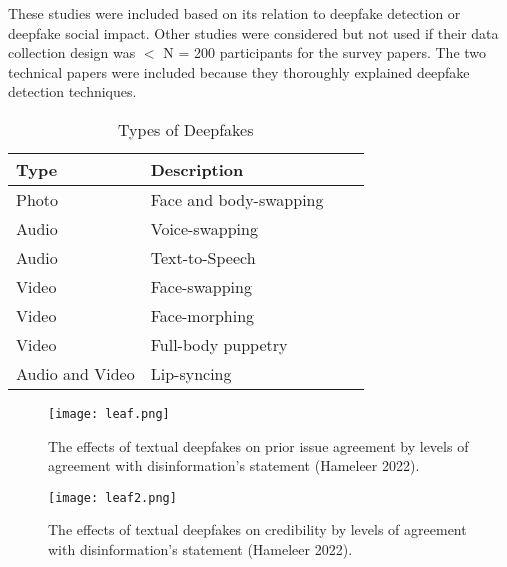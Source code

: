 \documentclass[
  journal=small,
  manuscript=article-type,  %
  year=2020,
  volume=37,
]{cup-journal}
\begin{document}
These studies were included based on its relation to deepfake detection or deepfake social impact. Other studies were considered but not used if their data collection design was $<$ N = 200 participants for the survey papers. The two technical papers were included because they thoroughly explained deepfake detection techniques. 

\begin{table}[hbt!]
\begin{threeparttable}
\caption{Types of Deepfakes}
\label{deepfake_type}
\begin{tabular}{llll}
\toprule
\headrow Type & Description \\
\midrule
Photo & Face and body-swapping\\ 
\midrule
Audio & Voice-swapping\\ 
\midrule
Audio & Text-to-Speech\\ 
\midrule
Video & Face-swapping\\ 
\midrule
Video & Face-morphing\\ 
\midrule
Video & Full-body puppetry\\ 
\midrule
Audio and Video & Lip-syncing\\ 
\bottomrule
\end{tabular}
\end{threeparttable}
\end{table}

\begin{figure*}
\centering
\texttt{[image: leaf.png]}
\caption{The effects of textual deepfakes on prior issue agreement by levels of agreement with disinformation's statement (Hameleer 2022).}
\label{fig_wide}
\end{figure*}

\begin{figure*}
\centering
\texttt{[image: leaf2.png]}
\caption{The effects of textual deepfakes on credibility by levels of agreement with disinformation's statement (Hameleer 2022).}
\label{fig_wide}
\end{figure*}
\end{document}
